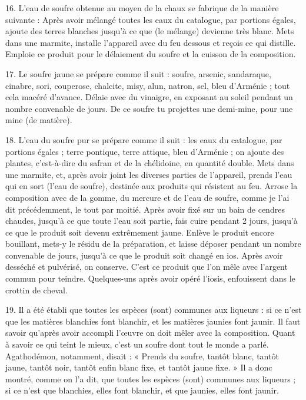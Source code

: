 \documentclass[a4paper, 11pt, oneside, polutonikogreek, french]{article}
\begin{document}
16. L'eau de soufre obtenue au moyen de la chaux se fabrique de la manière suivante : Après avoir mélangé toutes les eaux du catalogue, par portions égales, ajoute des terres blanches jusqu'à ce que (le mélange) devienne très blanc. Mets dans une marmite, installe l'appareil avec du feu dessous et reçois ce qui distille. Emploie ce produit pour le délaiement du soufre et la cuisson de la composition.

17. Le soufre jaune se prépare comme il suit : soufre, arsenic, sandaraque, cinabre, sori, couperose, chalcite, misy, alun, natron, sel, bleu d'Arménie ; tout cela macéré d'avance. Délaie avec du vinaigre, en exposant au soleil pendant un nombre convenable de jours. De ce soufre tu projettes une demi-mine, pour une mine (de matière).

18. L'eau du soufre pur se prépare comme il suit : les eaux du catalogue, par portions égales ; terre pontique, terre attique, bleu d'Arménie ; on ajoute des plantes, c'est-à-dire du safran et de la chélidoine, en quantité double. Mets dans une marmite, et, après avoir joint les diverses parties de l'appareil, prends l'eau qui en sort (l'eau de soufre), destinée aux produits qui résistent au feu. Arrose la composition avec de la gomme, du mercure et de l'eau de soufre, comme je l'ai dit précédemment, le tout par moitié. Après avoir fixé sur un bain de cendres chaudes, jusqu'à ce que toute l'eau soit partie, fais cuire pendant 2 jours, jusqu'à ce que le produit soit devenu extrêmement jaune. Enlève le produit encore bouillant, mets-y le résidu de la préparation, et laisse déposer pendant un nombre convenable de jours, jusqu'à ce que le produit soit changé en ios. Après avoir desséché et pulvérisé, on conserve. C'est ce produit que l'on mêle avec l'argent commun pour teindre. Quelques-uns après avoir opéré l'iosis, enfouissent dans le crottin de cheval.

19. Il a été établi que toutes les espèces (sont) communes aux liqueurs : si ce n'est que les matières blanchies font blanchir, et les matières jaunies font jaunir. Il faut savoir qu'après avoir accompli l'œuvre on doit mêler avec la composition. Quant à savoir ce qui teint le mieux, c'est un soufre dont tout le monde a parlé. Agathodémon, notamment, disait : « Prends du soufre, tantôt blanc, tantôt jaune, tantôt noir, tantôt enfin blanc fixe, et tantôt jaune fixe. » Il a donc montré, comme on l'a dit, que toutes les espèces (sont) communes aux liqueurs ; si ce n'est que blanchies, elles font blanchir, et que jaunies, elles font jaunir.
\end{document}
